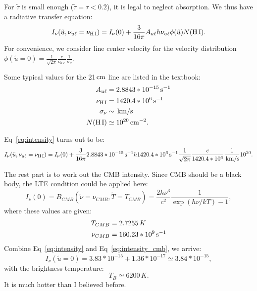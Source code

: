 \documentclass[12pt,letterpaper]{article}
\newcommand{\hi}{\textrm{H\,I}}
\newcommand{\cm}{\textrm{\,cm}}
\newcommand{\kms}{\textrm{\,km/s}}
\newcommand{\cmcm}{\textrm{\,cm}^{-2}}
\newcommand{\hz}{\textrm{\,s}^{-1}}
\begin{document}
For $\tilde \tau$ is small enough ($\tilde{\tau} = \tau < 0.2$), it is legal to neglect absorption.
We thus have a radiative transfer equation:
\begin{equation}
    I_\nu(\tilde u, \nu_{u\ell}=\nu_{\hi}) = I_\nu(0) +
    \frac{3}{16\pi} A_{u\ell} h \nu_{u\ell} \phi(\tilde u) N(\hi).
    \label{eq:intensity}
\end{equation}
For convenience, we consider line center velocity for the velocity distribution $\phi(\tilde{u} = 0) = \frac{1}{\sqrt{2\pi}}\frac{c}{\nu_{u\ell}}\frac{1}{\sigma_\nu}$.

Some typical values for the 21$\cm$ line are listed in the textbook:
\begin{equation*}
    \begin{split}
        A_{u\ell} &= 2.8843 * 10^{-15} \hz\\
        \nu_{\hi} &= 1420.4 * 10^{6} \hz\\
        \sigma_\nu &\sim \kms\\
        N(\hi) &\simeq 10^{20} \cmcm.
    \end{split}
\end{equation*}

Eq~\ref{eq:intensity} turns out to be:
\begin{equation*}
    I_\nu(\tilde u, \nu_{u\ell}=\nu_{\hi}) = I_\nu(0) +
    \frac{3}{16\pi}
    2.8843 * 10^{-15} \hz
    h 
    1420.4 * 10^{6} \hz
    \frac{1}{\sqrt{2\pi}}\frac{c}{1420.4 * 10^{6}}\frac{1}{\kms}
    10^{20}.    
\end{equation*}

The rest part is to work out the CMB intensity.
Since CMB should be a black body, the LTE condition could be applied here:
\begin{equation}
    I_\nu(0) = B_{CMB}(\tilde \nu = \nu_{CMB}, \tilde{T} = T_{CMB}) = \frac{2h\nu^3}{c^2}\frac{1}{\exp{(h\nu/kT) - 1}},
    \label{eq:intensity_cmb}
\end{equation}
where these values are given:
\begin{equation*}
    \begin{split}
        T_{CMB} &= 2.7255\,K\\
        \nu_{CMB} &= 160.23 * 10^{9} \hz
    \end{split}
\end{equation*}
Combine Eq~\ref{eq:intensity} and Eq~\ref{eq:intensity_cmb}, we arrive:
\begin{equation}
    I_\nu(\tilde{u} = 0) = 3.83 * 10^{-15} + 1.36 * 10^{-17} \simeq 3.84 * 10^{-15},
\end{equation}
with the brightness temperature:
\begin{equation*}
    T_{B} \simeq 6200 \,K.
\end{equation*}
It is much hotter than I believed before.
\end{document}
